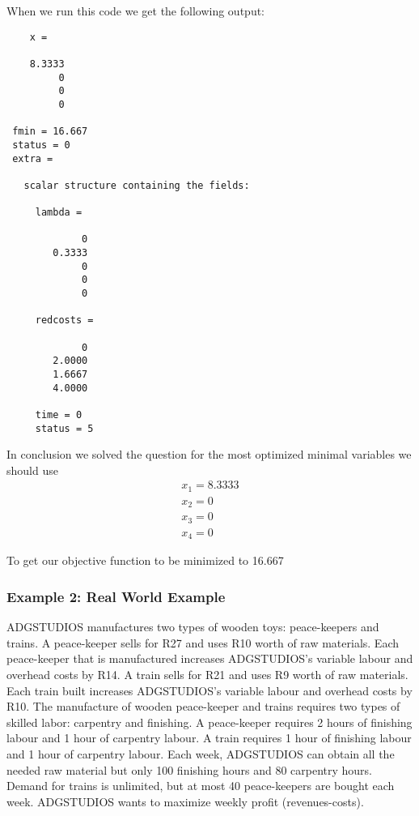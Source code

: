 When we run this code we get the following output:

\begin{verbatim}
    x =

    8.3333
         0
         0
         0
 
 fmin = 16.667
 status = 0
 extra =
 
   scalar structure containing the fields:
 
     lambda =
 
             0
        0.3333
             0
             0
             0
 
     redcosts =
 
             0
        2.0000
        1.6667
        4.0000
 
     time = 0
     status = 5
\end{verbatim}

In conclusion we solved the question for the most optimized minimal variables we should use
\begin{equation}
\begin{aligned}
    x_1 = 8.3333 \\
    x_2 = 0 \\
    x_3 = 0 \\
    x_4 = 0
\end{aligned}
\end{equation}

To get our objective function to be minimized to 16.667

\subsubsection{Example 2: Real World Example}
ADGSTUDIOS manufactures two types of wooden toys: peace-keepers and trains. A peace-keeper sells for R27 and uses R10 worth of raw materials. Each peace-keeper that is manufactured increases ADGSTUDIOS's variable labour and overhead costs by R14. A train sells for R21 and uses R9 worth of raw materials. Each train built increases ADGSTUDIOS's variable labour and overhead costs by R10. The manufacture of wooden peace-keeper and trains requires two types of skilled labor: carpentry and finishing. A peace-keeper requires 2 hours of finishing labour and 1 hour of carpentry labour. A train requires 1 hour of finishing labour and 1 hour of carpentry labour. Each week, ADGSTUDIOS can obtain all the needed raw material but only 100 finishing hours and 80 carpentry hours. Demand for trains is unlimited, but at most 40 peace-keepers are bought each week. ADGSTUDIOS wants to maximize weekly profit (revenues-costs).

